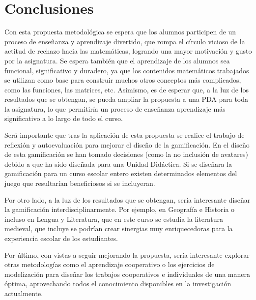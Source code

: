 
\chapter{Conclusiones}
\label{chap:conclusiones}

Con esta propuesta metodológica se espera que los alumnos participen de un proceso de enseñanza y aprendizaje divertido, que rompa el círculo vicioso de la actitud de rechazo hacia las matemáticas, logrando una mayor motivación y gusto por la asignatura.
%
Se espera también que el aprendizaje de los alumnos sea funcional, significativo y duradero, ya que los contenidos matemáticos trabajados se utilizan como base para construir muchos otros conceptos más complicados, como las funciones, las matrices, etc.
Asimismo, es de esperar que, a la luz de los resultados que se obtengan, se pueda ampliar la propuesta a una \gls{PDA} para toda la asignatura, lo que permitiría un proceso de enseñanza aprendizaje más significativo a lo largo de todo el curso.

Será importante que tras la aplicación de esta propuesta se realice el trabajo de reflexión y autoevaluación para mejorar el diseño de la gamificación.
%
En el diseño de esta gamificación se han tomado decisiones (como la no inclusión de avatares) debido a que ha sido diseñada para una Unidad Didáctica.
%
Si se diseñara la gamificación para un curso escolar entero existen determinados elementos del juego que resultarían beneficiosos si se incluyeran.


Por otro lado, a la luz de los resultados que se obtengan, sería interesante diseñar la gamificación interdisciplinarmente.
%
Por ejemplo, en Geografía e Historia o incluso en Lengua y Literatura, que en este curso se estudia la literatura medieval, que incluye  se podrían crear sinergias muy enriquecedoras para la experiencia escolar de los estudiantes.

Por último, con vistas a seguir mejorando la propuesta, sería interesante explorar otras metodologías como el aprendizaje cooperativo o los ejercicios de modelización para diseñar los trabajos cooperativos e individuales de una manera óptima, aprovechando todos el conocimiento disponibles en la investigación actualmente.


